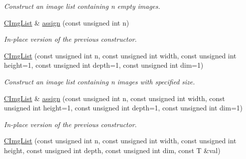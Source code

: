 \begin{DoxyCompactItemize}
\begin{DoxyCompactList}\small\item\em Construct an image list containing n empty images. \end{DoxyCompactList}\item 
\hypertarget{structcimg__library_1_1_c_img_list_a0f24623df6ce55cc7eff19abf90b7131}{\hyperlink{structcimg__library_1_1_c_img_list}{C\-Img\-List} \& \hyperlink{structcimg__library_1_1_c_img_list_a0f24623df6ce55cc7eff19abf90b7131}{assign} (const unsigned int n)}\label{structcimg__library_1_1_c_img_list_a0f24623df6ce55cc7eff19abf90b7131}

\begin{DoxyCompactList}\small\item\em In-\/place version of the previous constructor. \end{DoxyCompactList}\item 
\hypertarget{structcimg__library_1_1_c_img_list_a980a7f9e82d73959a1b2f06241d86171}{\hyperlink{structcimg__library_1_1_c_img_list_a980a7f9e82d73959a1b2f06241d86171}{C\-Img\-List} (const unsigned int n, const unsigned int width, const unsigned int height=1, const unsigned int depth=1, const unsigned int dim=1)}\label{structcimg__library_1_1_c_img_list_a980a7f9e82d73959a1b2f06241d86171}

\begin{DoxyCompactList}\small\item\em Construct an image list containing n images with specified size. \end{DoxyCompactList}\item 
\hypertarget{structcimg__library_1_1_c_img_list_a364dbd2a5ec37c6a8fe7bb0c987aa349}{\hyperlink{structcimg__library_1_1_c_img_list}{C\-Img\-List} \& \hyperlink{structcimg__library_1_1_c_img_list_a364dbd2a5ec37c6a8fe7bb0c987aa349}{assign} (const unsigned int n, const unsigned int width, const unsigned int height=1, const unsigned int depth=1, const unsigned int dim=1)}\label{structcimg__library_1_1_c_img_list_a364dbd2a5ec37c6a8fe7bb0c987aa349}

\begin{DoxyCompactList}\small\item\em In-\/place version of the previous constructor. \end{DoxyCompactList}\item 
\hypertarget{structcimg__library_1_1_c_img_list_aaa2b8d484fdb40a8c09a278fde62dd4a}{\hyperlink{structcimg__library_1_1_c_img_list_aaa2b8d484fdb40a8c09a278fde62dd4a}{C\-Img\-List} (const unsigned int n, const unsigned int width, const unsigned int height, const unsigned int depth, const unsigned int dim, const T \&val)}\label{structcimg__library_1_1_c_img_list_aaa2b8d484fdb40a8c09a278fde62dd4a}


\end{DoxyCompactItemize}
